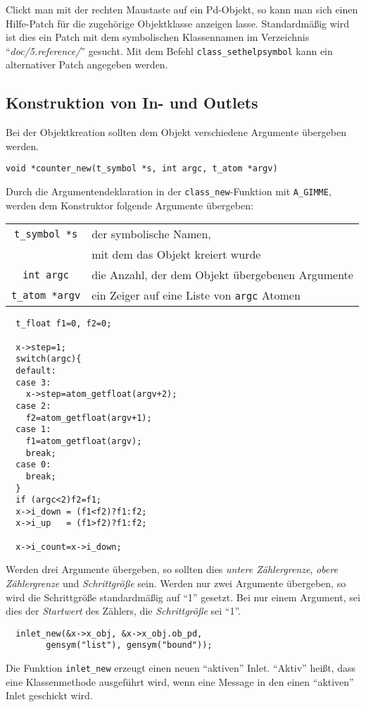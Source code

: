 \documentclass[12pt, a4paper,austrian, titlepage]{article}
\begin{document}
Clickt man mit der rechten Maustaste auf ein Pd-Objekt,
so kann man sich einen Hilfe-Patch für die zugehörige Objektklasse anzeigen lasse.
Standardmäßig wird ist dies ein Patch mit dem symbolischen Klassennamen
im Verzeichnis ``{\em doc/5.reference/}'' gesucht.
Mit dem Befehl \verb+class_sethelpsymbol+ kann ein alternativer Patch angegeben werden.

\subsection{Konstruktion von In- und Outlets}

Bei der Objektkreation sollten dem Objekt verschiedene Argumente übergeben
werden.

\begin{verbatim}
void *counter_new(t_symbol *s, int argc, t_atom *argv)
\end{verbatim}
Durch die Argumentendeklaration in der \verb+class_new+-Funktion
mit \verb+A_GIMME+, werden dem Konstruktor folgende Argumente
übergeben:

\begin{tabular}{c|l}
\verb+t_symbol *s+ & der symbolische Namen,\\
& mit dem das Objekt kreiert wurde \\
\verb+int argc+ & die Anzahl, der dem Objekt übergebenen Argumente\\
\verb+t_atom *argv+ & ein Zeiger auf eine Liste von {\tt argc} Atomen
\end{tabular}

\begin{verbatim}
  t_float f1=0, f2=0;

  x->step=1;
  switch(argc){
  default:
  case 3:
    x->step=atom_getfloat(argv+2);
  case 2:
    f2=atom_getfloat(argv+1);
  case 1:
    f1=atom_getfloat(argv);
    break;
  case 0:
    break;
  }
  if (argc<2)f2=f1;
  x->i_down = (f1<f2)?f1:f2;
  x->i_up   = (f1>f2)?f1:f2;

  x->i_count=x->i_down;
\end{verbatim}

Werden drei Argumente übergeben, so sollten dies {\em untere Zählergrenze},
{\em obere Zählergrenze} und {\em Schrittgröße} sein.
Werden nur zwei Argumente übergeben,
so wird die Schrittgröße standardmäßig auf ``1'' gesetzt.
Bei nur einem Argument, sei dies der {\em Startwert} des Zählers,
die {\em Schrittgröße} sei ``1''.

\begin{verbatim}
  inlet_new(&x->x_obj, &x->x_obj.ob_pd,
        gensym("list"), gensym("bound"));
\end{verbatim}
Die Funktion \verb+inlet_new+ erzeugt einen neuen ``aktiven'' Inlet.
``Aktiv'' heißt, dass eine Klassenmethode ausgeführt wird,
wenn eine Message in den einen ``aktiven'' Inlet geschickt wird.
\end{document}
